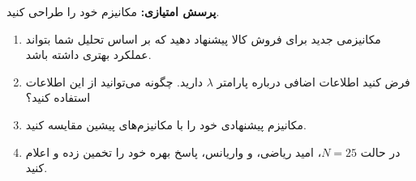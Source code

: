 \documentclass[a4paper]{article}
\begin{document}
\textbf{پرسش امتیازی:} مکانیزم خود را طراحی کنید.

\begin{enumerate}
    \item مکانیزمی جدید برای فروش کالا پیشنهاد دهید که بر اساس تحلیل شما بتواند عملکرد بهتری داشته باشد.
    \item فرض کنید اطلاعات اضافی درباره پارامتر $\lambda$ دارید. چگونه می‌توانید از این اطلاعات استفاده کنید؟
    \item مکانیزم پیشنهادی خود را با مکانیزم‌های پیشین مقایسه کنید.
    \item در حالت $N=25$، امید ریاضی، و واریانس، پاسخ بهره خود را تخمین زده و اعلام کنید.
\end{enumerate}
\end{document}
